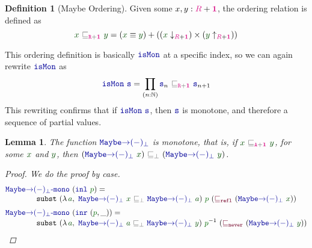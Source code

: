 \documentclass[twoside,11pt,openright]{report}
\theoremstyle{plain} %
\newtheorem{lem}[thm]{Lemma}
\theoremstyle{definition}
\newtheorem{defn}[thm]{Definition}%
\theoremstyle{remark}
\newcommand*{\term}[1]{\textcolor{green!30!black}{#1}} %
\newcommand*{\pathterm}[1]{\textcolor{green!40!black}{#1}}
\newcommand*{\type}[1]{\textcolor{magenta!90!black}{#1}}
\newcommand*{\unit}{\type{\textbf{1}}}
\newcommand*{\relation}[1]{\textcolor{gray!75!black}{\ensuremath{\mathtt{#1}}}}
\newcommand*{\function}[1]{\textcolor{blue!60!black}{\ensuremath{\mathtt{#1}}}}
\newcommand*{\constructor}[1]{\textcolor{purple!60!black}{\ensuremath{\mathtt{#1}}}}
\newcommand*{\sym}[1]{\ensuremath{#1^{-1}}}
\begin{document}
\begin{defn}[Maybe Ordering]
  \label{eq:maybe-order}
  Given some \(x,y : \type{R} + \unit\), the ordering relation is defined as
  \begin{equation}
    \term{x}~\relation{\sqsubseteq_{\type{R} + \unit}}~\term{y} = (\term{x} \equiv \term{y}) + ((\term{x}  \downarrow_{\type{R} + \unit}) \times (\term{y} \uparrow_{\type{R} + \unit}))
  \end{equation}
\end{defn}
\noindent This ordering definition is basically \(\function{isMon}\) at a specific index, so we can again rewrite \(\function{isMon}\) as
\begin{equation}
  \function{isMon}~\function{s} = \prod_{(n : \mathbb{N})} \function{s}_n~\relation{\sqsubseteq_{\type{R} + \unit}}~\function{s}_{n+1}
\end{equation}
This rewriting confirms that if \(\function{isMon}~\function{s}\), then \(\function{s}\) is monotone, and therefore a sequence of partial values.
\begin{lem}
  The function \(\function{Maybe{\rightarrow}(-)_\bot}\) is monotone, that is, if \(\term{x}~\relation{\sqsubseteq_{\type{A} + \unit}}~\term{y}\), for some \(\term{x}\) and \(\term{y}\), then \((\function{Maybe{\rightarrow}(-)_\bot}~\term{x})~\relation{\sqsubseteq_{\bot}}~(\function{Maybe{\rightarrow}(-)_\bot}~\term{y})\).
  \begin{proof}
    We do the proof by case.
    \begin{equation}
      \begin{aligned}
        &\function{Maybe{\rightarrow}(-)_\bot\text{-}mono}~(\function{inl}~\pathterm{p}) = \\[-1mm]
        &\qquad\qquad \mathtt{subst}~(\lambda\,\term{a},~\function{Maybe{\rightarrow}(-)_\bot}~\term{x}~\relation{\sqsubseteq_{\bot}}~\function{Maybe{\rightarrow}(-)_\bot}~\term{a})~\pathterm{p}~(\constructor{\sqsubseteq_{refl}}~(\function{Maybe{\rightarrow}(-)_\bot}~\term{x})) \\[1mm]
        &\function{Maybe{\rightarrow}(-)_\bot\text{-}mono}~(\function{inr}~(\pathterm{p}, \_)) = \\[-1mm]
        &\qquad\qquad \mathtt{subst}~(\lambda\,\term{a},~\function{Maybe{\rightarrow}(-)_\bot}~\term{a}~\relation{\sqsubseteq_{\bot}}~\function{Maybe{\rightarrow}(-)_\bot}~\term{y})~\sym{\pathterm{p}}~(\constructor{\sqsubseteq_{never}}~(\function{Maybe{\rightarrow}(-)_\bot}~\term{y}))
      \end{aligned}
    \end{equation}
  \end{proof}
\end{lem}
\end{document}
